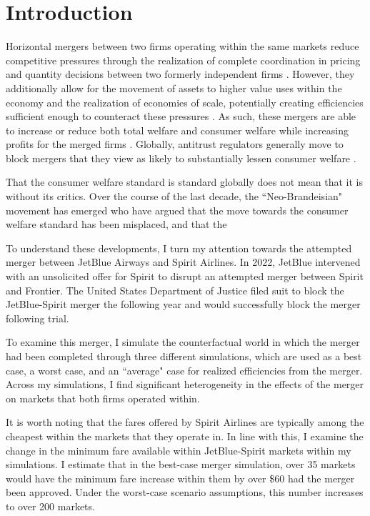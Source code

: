 \documentclass{article}
\begin{document}
    \section{Introduction}

    Horizontal mergers between two firms operating within the same markets reduce competitive pressures through the realization of complete coordination in pricing and quantity decisions between two formerly independent firms \citep{stigler_theory_1964}. However, they additionally allow for the movement of assets to higher value uses within the economy and the realization of economies of scale, potentially creating efficiencies sufficient enough to counteract these pressures \citep{williamson_economies_1968, kaplow_improving_2025}. As such, these mergers are able to increase or reduce both total welfare and consumer welfare while increasing profits for the merged firms \citep{farrell_horizontal_1990}. Globally, antitrust regulators generally move to block mergers that they view as likely to substantially lessen consumer welfare \citep{whinston_chapter_2007}.

    That the consumer welfare standard is standard globally does not mean that it is without its critics. Over the course of the last decade, the ``Neo-Brandeisian" movement has emerged who have argued that the move towards the consumer welfare standard has been misplaced, and that the 

    To understand these developments, I turn my attention towards the attempted merger between JetBlue Airways and Spirit Airlines. In 2022, JetBlue intervened with an unsolicited offer for Spirit to disrupt an attempted merger between Spirit and Frontier. The United States Department of Justice filed suit to block the JetBlue-Spirit merger the following year and would successfully block the merger following trial. 

    To examine this merger, I simulate the counterfactual world in which the merger had been completed through three different simulations, which are used as a best case, a worst case, and an ``average" case for realized efficiencies from the merger. Across my simulations, I find significant heterogeneity in the effects of the merger on markets that both firms operated within. 

    It is worth noting that the fares offered by Spirit Airlines are typically among the cheapest within the markets that they operate in. In line with this, I examine the change in the minimum fare available within JetBlue-Spirit markets within my simulations. I estimate that in the best-case merger simulation, over 35 markets would have the minimum fare increase within them by over \$60 had the merger been approved. Under the worst-case scenario assumptions, this number increases to over 200 markets. 
\end{document}
